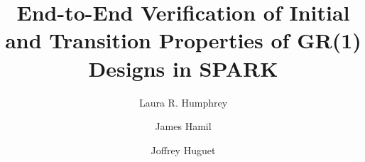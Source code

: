 \documentclass[runningheads]{llncs}
\begin{document}
\lstset{language=Ada}
\lstset{basicstyle=\ttfamily}
%
\title{\large End-to-End Verification of Initial and Transition Properties of GR(1) Designs in SPARK}

%
%

\author{Laura R. Humphrey \and
James Hamil \and
Joffrey Huguet}
%

\end{document}

